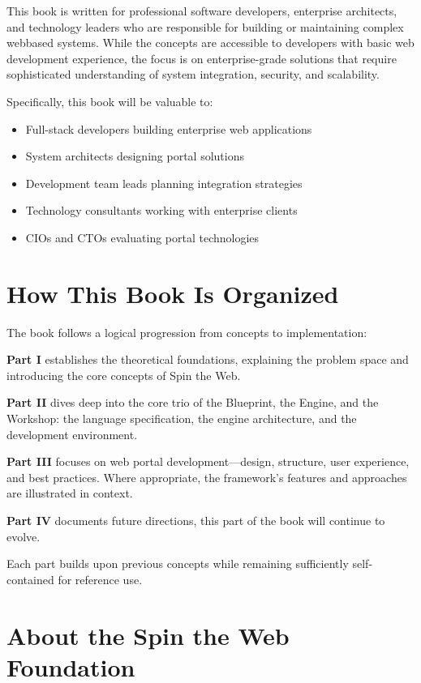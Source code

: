 This book is written for professional software developers, enterprise architects, and technology leaders who are responsible for building or maintaining complex webbased systems. While the concepts are accessible to developers with basic web development experience, the focus is on enterprise-grade solutions that require sophisticated understanding of system integration, security, and scalability.

Specifically, this book will be valuable to:
\begin{itemize}
\item Full-stack developers building enterprise web applications
\item System architects designing portal solutions
\item Development team leads planning integration strategies
\item Technology consultants working with enterprise clients
\item CIOs and CTOs evaluating portal technologies
\end{itemize}

\section*{How This Book Is Organized}

The book follows a logical progression from concepts to implementation:

\textbf{Part I} establishes the theoretical foundations, explaining the problem space and introducing the core concepts of Spin the Web.

\textbf{Part II} dives deep into the core trio of the Blueprint, the Engine, and the Workshop: the \wbdl language specification, the \webspinner engine architecture, and the \studio development environment.

\textbf{Part III} focuses on web portal development—design, structure, user experience, and best practices. Where appropriate, the framework’s features and approaches are illustrated in context.

\textbf{Part IV} documents future directions, this part of the book will continue to evolve.

Each part builds upon previous concepts while remaining sufficiently self-contained for reference use.

\section*{About the Spin the Web Foundation}

